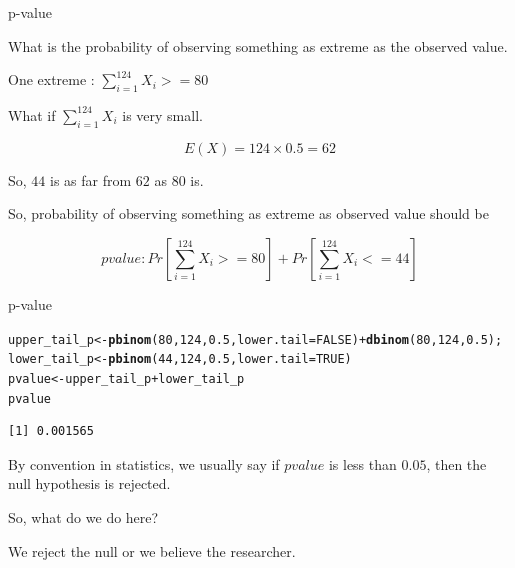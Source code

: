 \documentclass{beamer}\usepackage[]{graphicx}\usepackage[]{color}
\makeatletter
\newcommand{\hlnum}[1]{\textcolor[rgb]{0.2,0.2,0.2}{#1}}%
\newcommand{\hlopt}[1]{\textcolor[rgb]{0.102,0.102,0.102}{#1}}%
\newcommand{\hlstd}[1]{\textcolor[rgb]{0.102,0.102,0.102}{#1}}%
\newcommand{\hlkwb}[1]{\textcolor[rgb]{0.102,0.102,0.102}{#1}}%
\newcommand{\hlkwc}[1]{\textcolor[rgb]{0.2,0.2,0.2}{#1}}%
\newcommand{\hlkwd}[1]{\textcolor[rgb]{0.102,0.102,0.102}{\textbf{#1}}}%
\newenvironment{kframe}{%
 \def\at@end@of@kframe{}%
 \ifinner\ifhmode%
  \def\at@end@of@kframe{\end{minipage}}%
  \begin{minipage}{\columnwidth}%
 \fi\fi%
 \def\FrameCommand##1{\hskip\@totalleftmargin \hskip-\fboxsep
 \colorbox{shadecolor}{##1}\hskip-\fboxsep
     \hskip-\linewidth \hskip-\@totalleftmargin \hskip\columnwidth}%
 \MakeFramed {\advance\hsize-\width
   \@totalleftmargin\z@ \linewidth\hsize
   \@setminipage}}%
 {\par\unskip\endMakeFramed%
 \at@end@of@kframe}
\newenvironment{knitrout}{}{} %
\renewenvironment{knitrout}{\begin{spacing}{0.75}\begin{tiny}}{\end{tiny}\end{spacing}}
\makeatother
\begin{document}
\begin{frame}{p-value}

What is the probability of observing something as extreme as the observed value.\pause \newline

One extreme :  $\sum_{i=1}^{124} X_{i} >= 80$ \pause \newline

What if $\sum_{i=1}^{124} X_{i}$ is very small. \pause \newline

$$ E(X) = 124 \times 0.5 = 62 $$

So, $44$ is as far from $62$ as $80$ is. \pause \newline

So, probability of observing something as extreme as observed value should be 

$$  pvalue : Pr \left [ \sum_{i=1}^{124} X_{i} >= 80 \right ] +  Pr \left [ \sum_{i=1}^{124} X_{i} <= 44 \right ] $$

\end{frame}

\begin{frame}[fragile]{p-value}
\begin{knitrout}\small
{}\color{fgcolor}\begin{kframe}
\begin{alltt}
\hlstd{upper_tail_p} \hlkwb{<-} \hlkwd{pbinom}\hlstd{(}\hlnum{80}\hlstd{,}\hlnum{124}\hlstd{,}\hlnum{0.5}\hlstd{,}\hlkwc{lower.tail}\hlstd{=}\hlnum{FALSE}\hlstd{)} \hlopt{+} \hlkwd{dbinom}\hlstd{(}\hlnum{80}\hlstd{,}\hlnum{124}\hlstd{,}\hlnum{0.5}\hlstd{);}
\hlstd{lower_tail_p} \hlkwb{<-} \hlkwd{pbinom}\hlstd{(}\hlnum{44}\hlstd{,}\hlnum{124}\hlstd{,}\hlnum{0.5}\hlstd{,}\hlkwc{lower.tail}\hlstd{=}\hlnum{TRUE}\hlstd{)}
\hlstd{pvalue} \hlkwb{<-} \hlstd{upper_tail_p} \hlopt{+} \hlstd{lower_tail_p}
\hlstd{pvalue}
\end{alltt}
\begin{verbatim}
[1] 0.001565
\end{verbatim}
\end{kframe}
\end{knitrout}

By convention in statistics, we usually say if $pvalue$ is less than $0.05$, then the null hypothesis is rejected. \pause \newline

So, what do we do here? \pause \newline

We reject the null or we believe the researcher.

\end{frame}
\end{document}
